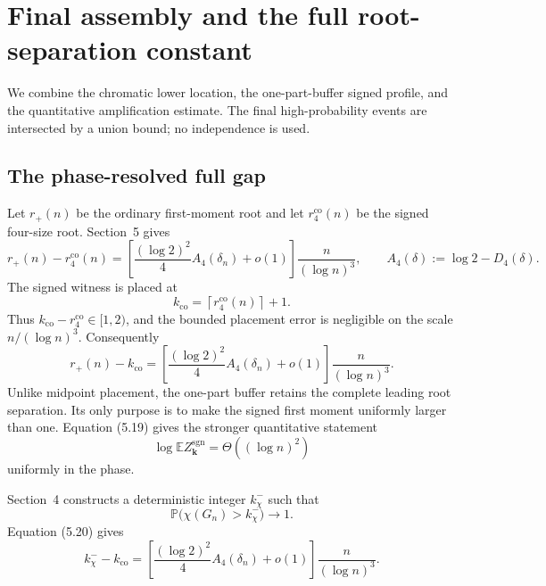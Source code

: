 \section{Final assembly and the full root-separation constant}
\label{sec:final-assembly-near-root-v4}

We combine the chromatic lower location, the one-part-buffer signed profile,
and the quantitative amplification estimate. The final high-probability events
are intersected by a union bound; no independence is used.

\subsection{The phase-resolved full gap}

Let $r_+(n)$ be the ordinary first-moment root and let
$r_4^{\mathrm{co}}(n)$ be the signed four-size root. Section~5 gives
\begin{equation}
  r_+(n)-r_4^{\mathrm{co}}(n)
  =
  \left[
    \frac{(\log 2)^2}{4}A_4(\delta_n)+o(1)
  \right]
  \frac{n}{(\log n)^3},
  \qquad
  A_4(\delta):=\log 2-D_4(\delta).
  \label{eq:phase-resolved-root-gap-v4}
\end{equation}
The signed witness is placed at
\[
  k_{\mathrm{co}}
  =\left\lceil r_4^{\mathrm{co}}(n)\right\rceil+1.
\]
Thus $k_{\mathrm{co}}-r_4^{\mathrm{co}}\in[1,2)$, and the bounded placement
error is negligible on the scale $n/(\log n)^3$. Consequently
\begin{equation}
  r_+(n)-k_{\mathrm{co}}
  =
  \left[
    \frac{(\log 2)^2}{4}A_4(\delta_n)+o(1)
  \right]
  \frac{n}{(\log n)^3}.
  \label{eq:near-root-retained-gap-v4}
\end{equation}
Unlike midpoint placement, the one-part buffer retains the complete leading
root separation. Its only purpose is to make the signed first moment uniformly
larger than one. Equation (5.19) gives the stronger quantitative statement
\[
  \log\mathbb E Z_{\mathbf k}^{\mathrm{sgn}}
  =\Theta((\log n)^2)
\]
uniformly in the phase.

Section~4 constructs a deterministic integer $k_\chi^-$ such that
\[
  \mathbb P\bigl(\chi(G_n)>k_\chi^-\bigr)\longrightarrow1.
\]
Equation (5.20) gives
\begin{equation}
  k_\chi^- - k_{\mathrm{co}}
  =
  \left[
    \frac{(\log 2)^2}{4}A_4(\delta_n)+o(1)
  \right]
  \frac{n}{(\log n)^3}.
  \label{eq:integer-full-location-gap-v4}
\end{equation}

